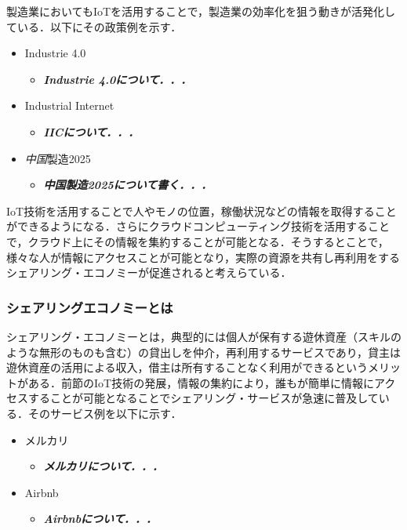 製造業においてもIoTを活用することで，製造業の効率化を狙う動きが活発化している．以下にその政策例を示す．

\begin{itemize}
\tightlist
\item
  Industrie 4.0\cite{Industrie4.0}

  \begin{itemize}
  \tightlist
  \item
    \textbf{\emph{Industrie 4.0について．．．}}
  \end{itemize}
\item
  Industrial Internet\cite{IIC}

  \begin{itemize}
  \tightlist
  \item
    \textbf{\emph{IICについて．．．}}
  \end{itemize}
\item
  \emph{中国}製造2025

  \begin{itemize}
  \tightlist
  \item
    \textbf{\emph{中国製造2025について書く．．．}}
  \end{itemize}
\end{itemize}

IoT技術を活用することで人やモノの位置，稼働状況などの情報を取得することができるようになる．さらにクラウドコンピューティング技術を活用することで，クラウド上にその情報を集約することが可能となる．そうするとことで，様々な人が情報にアクセスことが可能となり，実際の資源を共有し再利用をするシェアリング・エコノミーが促進されると考えらている\cite{Soumu-sharing}．

\hypertarget{ux30b7ux30a7ux30a2ux30eaux30f3ux30b0ux30a8ux30b3ux30ceux30dfux30fcux3068ux306f}{%
\subsubsection{シェアリングエコノミーとは}\label{ux30b7ux30a7ux30a2ux30eaux30f3ux30b0ux30a8ux30b3ux30ceux30dfux30fcux3068ux306f}}

シェアリング・エコノミーとは，典型的には個人が保有する遊休資産（スキルのような無形のものも含む）の貸出しを仲介，再利用するサービスであり，貸主は遊休資産の活用による収入，借主は所有することなく利用ができるというメリットがある\cite{Soumu-sharing}．前節のIoT技術の発展，情報の集約により，誰もが簡単に情報にアクセスすることが可能となることでシェアリング・サービスが急速に普及している．そのサービス例を以下に示す．

\begin{itemize}
\tightlist
\item
  メルカリ

  \begin{itemize}
  \tightlist
  \item
    \textbf{\emph{メルカリについて．．．}}
  \end{itemize}
\item
  Airbnb

  \begin{itemize}
  \tightlist
  \item
    \textbf{\emph{Airbnbについて．．．}}
  \end{itemize}
\end{itemize}

